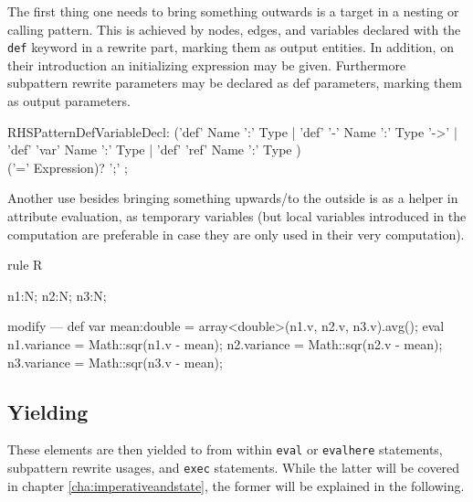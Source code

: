 The first thing one needs to bring something outwards is a target in a nesting or calling pattern. 
This is achieved by nodes, edges, and variables declared with the \texttt{def} keyword in a rewrite part, marking them as output entities.
In addition, on their introduction an initializing expression may be given.
Furthermore subpattern rewrite parameters may be declared as def parameters,
marking them as output parameters.

\begin{rail} 
  RHSPatternDefVariableDecl: 
	('def' Name ':' Type |
	'def' '-' Name ':' Type '->' |
	'def' 'var' Name ':' Type |
	'def' 'ref' Name ':' Type ) \\
	('=' Expression)? ';'
	;
\end{rail}

Another use besides bringing something upwards/to the outside is as a helper in attribute evaluation,
as temporary variables (but local variables introduced in the computation are preferable in case they are only used in their very computation).

\begin{example}
  \begin{grgen}
rule R {
  n1:N; n2:N; n3:N;
  
  modify {
  ---
    def var mean:double = array<double>(n1.v, n2.v, n3.v).avg();
    eval {
    	n1.variance = Math::sqr(n1.v - mean); 
    	n2.variance = Math::sqr(n2.v - mean); 
    	n3.variance = Math::sqr(n3.v - mean); 
    }
  }
}
  \end{grgen}
\end{example}

\subsection{Yielding}\label{sub:yield} 

These elements are then yielded to from within \texttt{eval} or \texttt{evalhere} statements, subpattern rewrite usages, and \texttt{exec} statements.
While the latter will be covered in chapter \ref{cha:imperativeandstate}, the former will be explained in the following.

